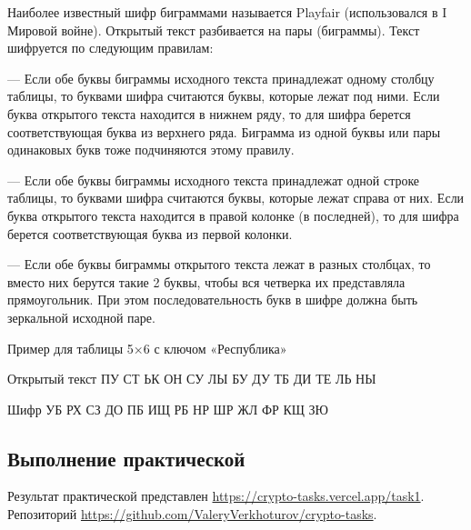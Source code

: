 Наиболее известный шифр биграммами называется Playfair
(использовался в I Мировой войне). Открытый текст разбивается на пары
(биграммы). Текст шифруется по следующим правилам:

--- Если обе буквы биграммы исходного текста принадлежат одному
столбцу таблицы, то буквами шифра считаются буквы, которые лежат под
ними. Если буква открытого текста находится в нижнем ряду, то для шифра
берется соответствующая буква из верхнего ряда. Биграмма из одной буквы
или пары одинаковых букв тоже подчиняются этому правилу.

--- Если обе буквы биграммы исходного текста принадлежат одной строке
таблицы, то буквами шифра считаются буквы, которые лежат справа от них.
Если буква открытого текста находится в правой колонке (в последней), то для
шифра берется соответствующая буква из первой колонки.

--- Если обе буквы биграммы открытого текста лежат в разных столбцах,
то вместо них берутся такие 2 буквы, чтобы вся четверка их представляла
прямоугольник. При этом последовательность букв в шифре должна быть
зеркальной исходной паре.

Пример для таблицы 5×6 с ключом «Республика» 

Открытый текст ПУ СТ ЬК ОН СУ ЛЫ БУ ДУ ТБ ДИ ТЕ ЛЬ НЫ

Шифр УБ РХ СЗ ДО ПБ ИЩ РБ НР ШР ЖЛ ФР КЩ ЗЮ

\subsection{Выполнение практической}

Результат практической представлен \url{https://crypto-tasks.vercel.app/task1}.
Репозиторий \url{https://github.com/ValeryVerkhoturov/crypto-tasks}.


